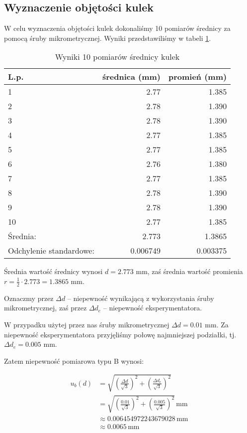 \documentclass[a4paper]{article}
\begin{document}
\subsection{Wyznaczenie objętości kulek}

W celu wyznaczenia objętości kulek dokonaliśmy 10 pomiarów średnicy za pomocą śruby mikrometrycznej.
Wyniki przedstawiliśmy w tabeli \ref{kulki_srednica}.

\begin{table}[h!]
	\centering
	\begin{tabular}{lrr}
		\toprule
		L.p. &  średnica (mm) &  promień (mm) \\
		\midrule
		1 &           2.77 &         1.385 \\
		2 &           2.78 &         1.390 \\
		3 &           2.78 &         1.390 \\
		4 &           2.77 &         1.385 \\
		5 &           2.77 &         1.385 \\
		6 &           2.76 &         1.380 \\
		7 &           2.77 &         1.385 \\
		8 &           2.78 &         1.390 \\
		9 &           2.78 &         1.390 \\
		10 &           2.77 &         1.385 \\
		\midrule
		Średnia: & 2.773 & 1.3865 \\
		Odchylenie standardowe: & 0.006749 & 0.003375 \\
		\bottomrule
	\end{tabular}
	\caption{Wyniki 10 pomiarów średnicy kulek}
	\label{kulki_srednica}
\end{table}

Średnia wartość średnicy wynosi $d = 2.773$ mm, zaś średnia wartość promienia $r = \frac 1 2 \cdot 2.773 = 1.3865$ mm.

Oznaczmy przez $\Delta d$ -- niepewność wynikającą z wykorzystania śruby mikrometrycznej,
zaś przez $\Delta d_e$ -- niepewność eksperymentatora.

W przypadku użytej przez nas śruby mikrometrycznej $\Delta d = 0.01$ mm.
Za niepewność eksperymentatora przyjęliśmy połowę najmniejszej podziałki, tj. $\Delta d_e = 0.005$ mm.

Zatem niepewność pomiarowa typu B wynosi:

\begin{align*}
	u_b(d) &= \sqrt{\left(\frac{\Delta d}{\sqrt 3}\right)^2 + \left(\frac{\Delta d_e}{\sqrt 3}\right)^2} \\
	&= \sqrt{\left(\frac{0.01}{\sqrt 3}\right)^2 + \left(\frac{0.005}{\sqrt 3}\right)^2} \, \text{mm} \\
	&\approx 0.006454972243679028 \, \text{mm} \\
	&\approx 0.0065 \, \text{mm}
\end{align*}
\end{document}
